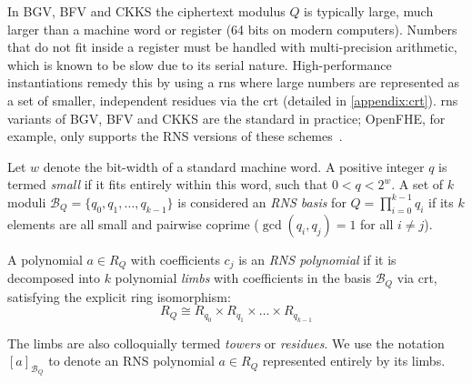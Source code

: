 In BGV, BFV and CKKS the ciphertext modulus $Q$ is typically large, much larger than a machine word or register (64 bits on modern computers). Numbers that do not fit inside a register must be handled with multi-precision arithmetic, which is known to be slow due to its serial nature. %
High-performance instantiations remedy this by using a \gls{rns} where large numbers are represented as a set of smaller, independent residues via the \gls{crt} (detailed in \autoref{appendix:crt}). \gls{rns} variants of BGV, BFV and CKKS are the standard in practice; OpenFHE, for example, only supports the RNS versions of these schemes~\cite{cryptoeprint:2022/915}.

\begin{definition}
    Let $w$ denote the bit-width of a standard machine word. A positive integer $q$ is termed \emph{small} if it fits entirely within this word, such that $0 < q < 2^w$. A set of $k$ moduli $\mathcal{B}_Q = \{q_0, q_1, \dots, q_{k-1}\}$ is considered an \emph{RNS basis} for $Q = \prod_{i=0}^{k-1} q_i$ if its $k$ elements are all small and pairwise coprime ($\gcd(q_i, q_j) = 1$ for all $i \neq j$).
\end{definition}

\begin{definition}
    \label{def:rns-poly}
    A polynomial $a\in R_Q$ with coefficients $c_j$ is an \emph{RNS polynomial} if it is decomposed into $k$ polynomial \emph{limbs} with coefficients in the basis $\mathcal{B}_Q$ via \gls{crt}, satisfying the explicit ring isomorphism:
    \begin{equation}
        \label{eq:rns-poly}
        R_{Q} \cong R_{q_0} \times R_{q_1} \times \dots \times R_{q_{k-1}}
    \end{equation}

    The limbs are also colloquially termed \emph{towers} or \emph{residues}. We use the notation $[a]_{\mathcal{B}_Q}$ to denote an RNS polynomial $a\in R_Q$ represented entirely by its limbs.
\end{definition}

